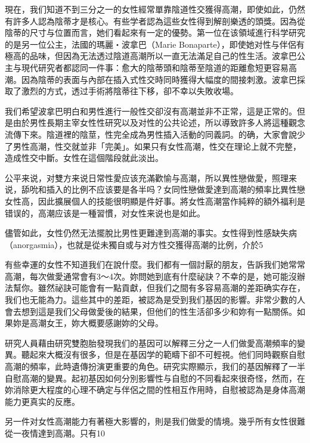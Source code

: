 \documentclass[12pt,UTF8]{ctexbook}
\begin{document}
現在，我们知道不到三分之一的女性經常單靠陰道性交獲得高潮，即使如此，仍然有許多人認為陰蒂才是核心。有些学者認為這些女性得到解剖樂透的頭獎。因為從陰蒂的尺寸与位置而言，她们看起來有一定的優勢。第一位在该領域進行科学研究的是另一位公主，法國的瑪麗‧波拿巴（Marie Bonaparte），即使她对性与伴侶有極高的品味，但因為无法透过陰道高潮所以一直无法滿足自己的性生活。波拿巴公主与現代研究者都認同一件事：愈大的陰蒂頭和陰蒂至陰道的距離愈短更容易高潮。因為陰蒂的表面与內部在插入式性交時同時獲得大幅度的間接刺激。波拿巴採取了激烈的方式，透过手術將陰蒂往下移，卻不幸以失敗收場。

我们希望波拿巴明白和男性進行一般性交卻沒有高潮並非不正常，這是正常的。但是由於男性長期主宰女性性研究以及对性的公共论述，所以導致許多人將這種觀念流傳下來。陰道裡的陰莖，性完全成為男性插入活動的同義詞。的确，大家會說少了男性高潮，性交就並非「完美」。如果只有女性高潮，性交在理论上就不完整，造成性交中斷。女性在這個階段就此淡出。

公平来说，对雙方来说日常性愛应该充滿歡愉与高潮，所以異性戀做愛，照理来说，舔吮和插入的比例不应该要是各半吗？女同性戀做愛達到高潮的頻率比異性戀女性高，因此擴展個人的技能很明顯是件好事。將女性高潮當作純粹的額外福利是错误的，高潮应该是一種習慣，对女性来说也是如此。

儘管如此，女性仍然无法擺脫比男性更難達到高潮的事实。女性得到性感缺失病（anorgasmia），也就是從未獨自或与对方性交獲得高潮的比例，介於5%

有些幸運的女性不知道我们在說什麼。我们都有一個討厭的朋友，告訴我们她常常高潮，每次做愛通常會有3〜4次。妳問她到底有什麼祕訣？不幸的是，她可能沒辦法幫你。雖然祕訣可能會有一點貢獻，但我们之間有多容易高潮的差距确实存在，我们也无能為力。這些其中的差距，被認為是受到我们基因的影響。非常少數的人會去想到這是我们父母做愛後的結果，但他们的性生活卻多少和妳有一點關係。如果妳是高潮女王，妳大概要感謝妳的父母。

研究人員藉由研究雙胞胎發現我们的基因可以解釋三分之一人们做愛高潮頻率的變異。聽起來大概沒有很多，但是在基因学的範疇下卻不可輕視。他们同時觀察自慰高潮的頻率，此時遺傳扮演更重要的角色。研究实際顯示，我们的基因解釋了一半自慰高潮的變異。起初基因如何分別影響性与自慰的不同看起來很奇怪，然而，在妳消除更大程度的心理不确定与伴侶之間的性相互作用時，自慰被認為是身体高潮能力更真实的反應。

另一件对女性高潮能力有著極大影響的，則是我们做愛的情境。幾乎所有女性很難從一夜情達到高潮。只有10%
\end{document}
